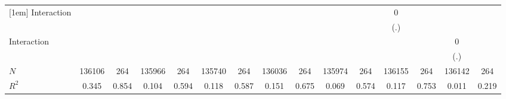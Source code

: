 \begin{table}[htbp]
\begin{tabular}{l*{14}{c}}
[1em]
Interaction &                     &                     &                     &                     &                     &                     &                     &                     &                     &                     &           0         &                     &                     &                     \\
            &                     &                     &                     &                     &                     &                     &                     &                     &                     &                     &         (.)         &                     &                     &                     \\
[1em]
Interaction &                     &                     &                     &                     &                     &                     &                     &                     &                     &                     &                     &                     &           0         &                     \\
            &                     &                     &                     &                     &                     &                     &                     &                     &                     &                     &                     &                     &         (.)         &                     \\
\hline
\(N\)       &      136106         &         264         &      135966         &         264         &      135740         &         264         &      136036         &         264         &      135974         &         264         &      136155         &         264         &      136142         &         264         \\
\(R^{2}\)   &       0.345         &       0.854         &       0.104         &       0.594         &       0.118         &       0.587         &       0.151         &       0.675         &       0.069         &       0.574         &       0.117         &       0.753         &       0.011         &       0.219         \\
\hline\hline
\end{tabular}
\end{table}
